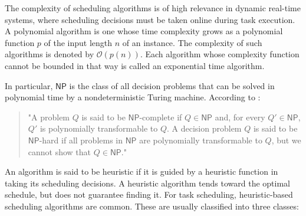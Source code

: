 \documentclass[conference]{IEEEtran}
\begin{document}

The complexity of scheduling algorithms is of high relevance in dynamic real-time systems, where scheduling decisions must be taken online during task execution. A polynomial algorithm is one whose time complexity grows as a polynomial function $p$ of the input length $n$ of an instance. The complexity of such algorithms is denoted by $\mathcal{O}(p(n))$. Each algorithm whose complexity function cannot be bounded in that way is called an exponential time algorithm.

In particular, $\mathsf{NP}$ is the class of all decision problems that can be solved in polynomial time by a nondeterministic Turing machine. According to \cite{butazo99}:

\begin{quote}
"A problem $Q$ is said to be $\mathsf{NP}$-complete if $Q \in \mathsf{NP}$ and, for every $Q' \in \mathsf{NP}$, $Q'$ is polynomially transformable to $Q$. A decision problem $Q$ is said to be $\mathsf{NP}$-hard if all problems in $\mathsf{NP}$ are polynomially transformable to $Q$, but we cannot show that $Q \in \mathsf{NP}$."
\end{quote}


An algorithm is said to be heuristic if it is guided by a heuristic function in taking its scheduling decisions. A heuristic algorithm tends toward the optimal schedule, but does not guarantee finding it. For task scheduling, heuristic-based scheduling algorithms are common. These are usually classified into three classes:
\end{document}
